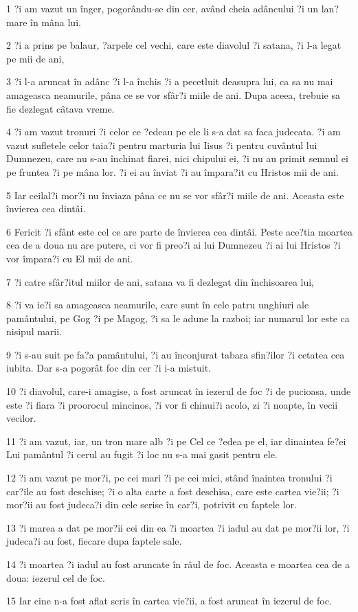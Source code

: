 \par 1 ?i am vazut un înger, pogorându-se din cer, având cheia adâncului ?i un lan? mare în mâna lui.
\par 2 ?i a prins pe balaur, ?arpele cel vechi, care este diavolul ?i satana, ?i l-a legat pe mii de ani,
\par 3 ?i l-a aruncat în adânc ?i l-a închis ?i a pecetluit deasupra lui, ca sa nu mai amageasca neamurile, pâna ce se vor sfâr?i miile de ani. Dupa aceea, trebuie sa fie dezlegat câtava vreme.
\par 4 ?i am vazut tronuri ?i celor ce ?edeau pe ele li s-a dat sa faca judecata. ?i am vazut sufletele celor taia?i pentru marturia lui Iisus ?i pentru cuvântul lui Dumnezeu, care nu s-au închinat fiarei, nici chipului ei, ?i nu au primit semnul ei pe fruntea ?i pe mâna lor. ?i ei au înviat ?i au împara?it cu Hristos mii de ani.
\par 5 Iar ceilal?i mor?i nu înviaza pâna ce nu se vor sfâr?i miile de ani. Aceasta este învierea cea dintâi.
\par 6 Fericit ?i sfânt este cel ce are parte de învierea cea dintâi. Peste ace?tia moartea cea de a doua nu are putere, ci vor fi preo?i ai lui Dumnezeu ?i ai lui Hristos ?i vor împara?i cu El mii de ani.
\par 7 ?i catre sfâr?itul miilor de ani, satana va fi dezlegat din închisoarea lui,
\par 8 ?i va ie?i sa amageasca neamurile, care sunt în cele patru unghiuri ale pamântului, pe Gog ?i pe Magog, ?i sa le adune la razboi; iar numarul lor este ca nisipul marii.
\par 9 ?i s-au suit pe fa?a pamântului, ?i au înconjurat tabara sfin?ilor ?i cetatea cea iubita. Dar s-a pogorât foc din cer ?i i-a mistuit.
\par 10 ?i diavolul, care-i amagise, a fost aruncat în iezerul de foc ?i de pucioasa, unde este ?i fiara ?i proorocul mincinos, ?i vor fi chinui?i acolo, zi ?i noapte, în vecii vecilor.
\par 11 ?i am vazut, iar, un tron mare alb ?i pe Cel ce ?edea pe el, iar dinaintea fe?ei Lui pamântul ?i cerul au fugit ?i loc nu s-a mai gasit pentru ele.
\par 12 ?i am vazut pe mor?i, pe cei mari ?i pe cei mici, stând înaintea tronului ?i car?ile au fost deschise; ?i o alta carte a fost deschisa, care este cartea vie?ii; ?i mor?ii au fost judeca?i din cele scrise în car?i, potrivit cu faptele lor.
\par 13 ?i marea a dat pe mor?ii cei din ea ?i moartea ?i iadul au dat pe mor?ii lor, ?i judeca?i au fost, fiecare dupa faptele sale.
\par 14 ?i moartea ?i iadul au fost aruncate în râul de foc. Aceasta e moartea cea de a doua: iezerul cel de foc.
\par 15 Iar cine n-a fost aflat scris în cartea vie?ii, a fost aruncat în iezerul de foc.

